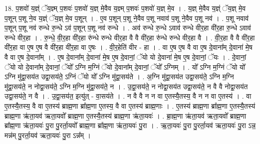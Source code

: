 \documentclass[17pt]{extarticle}
\begin{document}
18. प॒शवो॑ य॒ज्ञ्ं ॅय॒ज्ञ्म् प॒शवः॑ प॒शवो॑ य॒ज्ञ् मे॒वैव य॒ज्ञ्म् प॒शवः॑ प॒शवो॑ य॒ज्ञ् मे॒व । . य॒ज्ञ् मे॒वैव य॒ज्ञ्ं ॅय॒ज्ञ् मे॒व प॒शून् प॒शू ने॒व य॒ज्ञ्ं ॅय॒ज्ञ् मे॒व प॒शून् । . ए॒व प॒शून् प॒शू ने॒वैव प॒शू नवाव॑ प॒शू ने॒वैव प॒शू नव॑ । . प॒शू नवाव॑ प॒शून् प॒शू नव॑ रुन्धे रु॒न्धे ऽव॑ प॒शून् प॒शू नव॑ रुन्धे । . अव॑ रुन्धे रु॒न्धे ऽवाव॑ रुन्धे वीर॒हा वी॑र॒हा रु॒न्धे ऽवाव॑ रुन्धे वीर॒हा । . रु॒न्धे॒ वी॒र॒हा वी॑र॒हा रु॑न्धे रुन्धे वीर॒हा वै वै वी॑र॒हा रु॑न्धे रुन्धे वीर॒हा वै । . वी॒र॒हा वै वै वी॑र॒हा वी॑र॒हा वा ए॒ष ए॒ष वै वी॑र॒हा वी॑र॒हा वा ए॒षः । . वी॒र॒हेति॑ वीर - हा । . वा ए॒ष ए॒ष वै वा ए॒ष दे॒वाना᳚म् दे॒वाना॑ मे॒ष वै वा ए॒ष दे॒वाना᳚म् । . ए॒ष दे॒वाना᳚म् दे॒वाना॑ मे॒ष ए॒ष दे॒वानां॒ ॅयो यो दे॒वाना॑ मे॒ष ए॒ष दे॒वानां॒ ॅयः । . दे॒वानां॒ ॅयो यो दे॒वाना᳚म् दे॒वानां॒ ॅयो᳚ ऽग्नि म॒ग्निं ॅयो दे॒वाना᳚म् दे॒वानां॒ ॅयो᳚ ऽग्निम् । . यो᳚ ऽग्नि म॒ग्निं ॅयो यो᳚ ऽग्नि मु॑द्वा॒सय॑त उद्वा॒सय॑ते॒ ऽग्निं ॅयो यो᳚ ऽग्नि मु॑द्वा॒सय॑ते । . अ॒ग्नि मु॑द्वा॒सय॑त उद्वा॒सय॑ते॒ ऽग्नि म॒ग्नि मु॑द्वा॒सय॑ते॒ न नोद्वा॒सय॑ते॒ ऽग्नि म॒ग्नि मु॑द्वा॒सय॑ते॒ न । . उ॒द्वा॒सय॑ते॒ न नोद्वा॒सय॑त उद्वा॒सय॑ते॒ न वै वै नोद्वा॒सय॑त उद्वा॒सय॑ते॒ न वै । . उ॒द्वा॒सय॑त॒ इत्यु॑त् - वा॒सय॑ते । . न वै वै न न वा ए॒तस्यै॒तस्य॒ वै न न वा ए॒तस्य॑ । . वा ए॒तस्यै॒तस्य॒ वै वा ए॒तस्य॑ ब्राह्म॒णा ब्रा᳚ह्म॒णा ए॒तस्य॒ वै वा ए॒तस्य॑ ब्राह्म॒णाः । . ए॒तस्य॑ ब्राह्म॒णा ब्रा᳚ह्म॒णा ए॒तस्यै॒तस्य॑ ब्राह्म॒णा ऋ॑ता॒यव॑ ऋता॒यवो᳚ ब्राह्म॒णा ए॒तस्यै॒तस्य॑ ब्राह्म॒णा ऋ॑ता॒यवः॑ । . ब्रा॒ह्म॒णा ऋ॑ता॒यव॑ ऋता॒यवो᳚ ब्राह्म॒णा ब्रा᳚ह्म॒णा ऋ॑ता॒यवः॑ पु॒रा पु॒रर्ता॒यवो᳚ ब्राह्म॒णा ब्रा᳚ह्म॒णा ऋ॑ता॒यवः॑ पु॒रा । . ऋ॒ता॒यवः॑ पु॒रा पु॒रर्ता॒यव॑ ऋता॒यवः॑ पु॒रा ऽन्न॒ मन्न॑म् पु॒रर्ता॒यव॑ ऋता॒यवः॑ पु॒रा ऽन्न᳚म् । \newline
\end{document}
